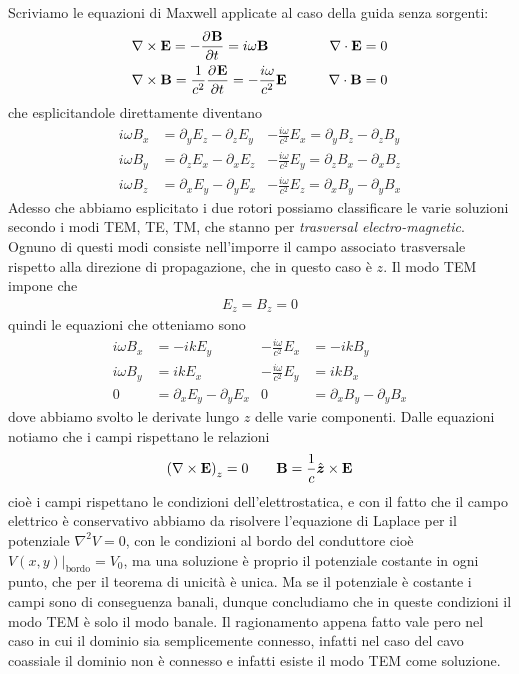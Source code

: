 Scriviamo le equazioni di Maxwell applicate al caso della guida senza sorgenti:
\begin{align}
  &\nabla \times \mathbf{E} = -\frac{\partial^{} {\mathbf{B}}}{\partial {t}^{}} = i\omega \mathbf{B} \qquad &\nabla \cdot \mathbf{E} = 0
  \\
  &\nabla \times \mathbf{B} = \frac{1}{c^2} \frac{\partial^{} {\mathbf{E}}}{\partial {t}^{}} = -\frac{i \omega}{c^2} \mathbf{E} \qquad &\nabla \cdot \mathbf{B} = 0
\end{align}
che esplicitandole direttamente diventano
\begin{align}
  i\omega B_x &= \partial_y E_z - \partial_z E_y  &{-\frac{i \omega}{c^2} E_x = \partial_y B_z - \partial_z B_y}
  \\
  i\omega B_y &= \partial_z E_x - \partial_x E_z  &{-\frac{i \omega}{c^2} E_y = \partial_z B_x - \partial_x B_z}
  \\
  i\omega B_z &= \partial_x E_y - \partial_y E_x  &{-\frac{i \omega}{c^2} E_z = \partial_x B_y - \partial_y B_x}
\end{align}
Adesso che abbiamo esplicitato i due rotori possiamo classificare le varie soluzioni secondo i modi TEM, TE, TM, che stanno per 
\textit{trasversal electro-magnetic}. Ognuno di questi modi consiste nell'imporre il campo associato trasversale rispetto alla direzione di propagazione, 
che in questo caso è $ z $. Il modo TEM impone che 
\begin{align}
  E_z = B_z = 0
\end{align}
quindi le equazioni che otteniamo sono
\begin{align}
  i\omega B_x &= - ik E_y & -\frac{i \omega}{c^2} E_x &= - ik B_y
  \\
  i\omega B_y &= ik E_x &  -\frac{i \omega}{c^2} E_y &= ik B_x 
  \\
  0 &= \partial_x E_y - \partial_y E_x & 0 &= \partial_x B_y - \partial_y B_x
\end{align}
dove abbiamo svolto le derivate lungo $ z $ delle varie componenti. Dalle equazioni notiamo che i campi rispettano le relazioni
\begin{align}
  \left( \nabla \times \mathbf{E} \right)_z = 0 \qquad \mathbf{B} = \frac{1}{c} \hat{\boldsymbol{z}} \times \mathbf{E}
\end{align}
cioè i campi rispettano le condizioni dell'elettrostatica, e con il fatto che il campo elettrico è conservativo abbiamo da risolvere l'equazione di 
Laplace per il potenziale $ \nabla^2 V = 0 $, con le condizioni al bordo del conduttore cioè $ V(x,y)|_{\text{bordo}} = V_0 $, ma una soluzione è proprio 
il potenziale costante in ogni punto, che per il teorema di unicità è unica. Ma se il potenziale è costante i campi sono di conseguenza banali, dunque 
concludiamo che in queste condizioni il modo TEM è solo il modo banale. Il ragionamento appena fatto vale pero nel caso in cui il dominio sia 
semplicemente connesso, infatti nel caso del cavo coassiale il dominio non è connesso e infatti esiste il modo TEM come soluzione.

